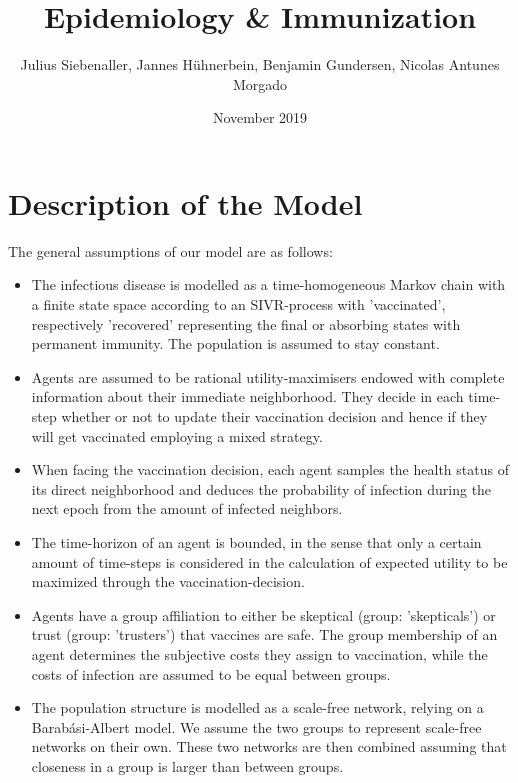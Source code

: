 \documentclass[11pt]{article}
\title{Epidemiology \& Immunization}
\author{Julius Siebenaller, Jannes Hühnerbein, Benjamin Gundersen, Nicolas Antunes Morgado}
\date{November 2019}
\begin{document}
\section{Description of the Model}


The general assumptions of our model are as follows:
\begin{itemize}
\item{The infectious disease is modelled as a time-homogeneous Markov chain with a finite state space according to an SIVR-process with 'vaccinated', respectively 'recovered' representing the final or absorbing states with permanent immunity. The population is assumed to stay constant.}
\item{Agents are assumed to be rational utility-maximisers endowed with complete information about their immediate neighborhood. They decide in each time-step whether or not to update their vaccination decision and hence if they will get vaccinated employing a mixed strategy.}
\item{When facing the vaccination decision, each agent samples the health status of its direct neighborhood and deduces the probability of infection during the next epoch from the amount of infected neighbors.}
\item{The time-horizon of an agent is bounded, in the sense that only a certain amount of time-steps is considered in the calculation of expected utility to be maximized through the vaccination-decision.}
\item{Agents have a group affiliation to either be skeptical (group: 'skepticals') or trust (group: 'trusters') that vaccines are safe. The group membership of an agent determines the subjective costs they assign to vaccination, while the costs of infection are assumed to be equal between groups.}
\item{The population structure is modelled as a scale-free network, relying on a Barabási-Albert model. We assume the two groups to represent scale-free networks on their own. These two networks are then combined assuming that closeness in a group is larger than between groups.}
\end{itemize}
\end{document}
